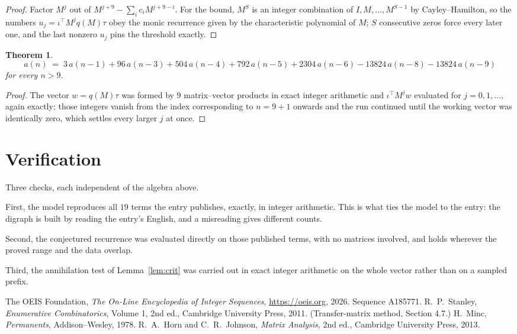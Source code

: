 \documentclass[11pt,a4paper]{article}
\theoremstyle{plain}
\newtheorem{theorem}{Theorem}
\theoremstyle{definition}
\begin{document}
\begin{proof}
Factor $M^{j}$ out of $M^{j+9}-\sum_ic_iM^{j+9-i}$. For the bound, $M^{S}$
is an integer combination of $I,M,\dots,M^{S-1}$ by Cayley--Hamilton, so the numbers
$u_j=\iota^{\!\top}M^{j}q(M)\tau$ obey the monic recurrence given by the characteristic
polynomial of $M$; $S$ consecutive zeros force every later one, and the last nonzero $u_j$
pins the threshold exactly.
\end{proof}

\begin{theorem}
\[
a(n)\;=\;3\,a(n-1) + 96\,a(n-3) + 504\,a(n-4) + 792\,a(n-5) + 2304\,a(n-6) - 13824\,a(n-8) - 13824\,a(n-9)
\]
for every $n>9$.
\end{theorem}

\begin{proof}
The vector $w=q(M)\tau$ was formed by $9$ matrix--vector products in exact integer
arithmetic and $\iota^{\!\top}M^{j}w$ evaluated for $j=0,1,\dots$, again exactly; those
integers vanish from the index corresponding to $n=9+1$ onwards and the run continued
until the working vector was identically zero, which settles every larger $j$ at once.
\end{proof}

\section{Verification}

Three checks, each independent of the algebra above.

First, the model reproduces all $19$ terms the entry publishes, exactly, in integer
arithmetic. This is what ties the model to the entry: the digraph is built by reading the
entry's English, and a misreading gives different counts.

Second, the conjectured recurrence was evaluated directly on those published terms, with no
matrices involved, and holds wherever the proved range and the data overlap.

Third, the annihilation test of Lemma~\ref{lem:crit} was carried out in exact integer
arithmetic on the whole vector rather than on a sampled prefix.

\begin{thebibliography}{9}
 The OEIS Foundation, \emph{The On-Line Encyclopedia of Integer
Sequences}, \url{https://oeis.org}, 2026. Sequence A185771.
 R.~P.~Stanley, \emph{Enumerative Combinatorics}, Volume 1, 2nd ed.,
Cambridge University Press, 2011. (Transfer-matrix method, Section 4.7.)
 H.~Minc, \emph{Permanents}, Addison--Wesley, 1978.
 R.~A.~Horn and C.~R.~Johnson, \emph{Matrix Analysis}, 2nd ed., Cambridge
University Press, 2013.
\end{thebibliography}
\end{document}
